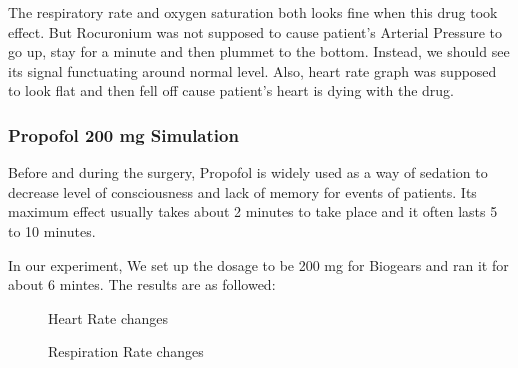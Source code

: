 \documentclass[a4paper]{article}
\begin{document}
The respiratory rate and oxygen saturation both looks fine when this drug took effect. But Rocuronium was not supposed to cause patient's Arterial Pressure to go up, stay for a minute and then plummet to the bottom. Instead, we should see its signal functuating around normal level. Also, heart rate graph was supposed to look flat and then fell off cause patient's heart is dying with the drug.
 
\subsubsection{Propofol 200 mg Simulation}

Before and during the surgery, Propofol is widely used as a way of sedation to decrease level of consciousness and lack of memory for events of patients. Its maximum effect usually takes about 2 minutes to take place and it often lasts 5 to 10 minutes.

In our experiment, We set up the dosage to be 200 mg for Biogears and ran it for about 6 mintes. The results are as followed:

\begin{figure}[!htb]\centering
   
\end{figure}

\begin{figure}[!htb]\centering
   \begin{minipage}{0.49\textwidth}
     \caption{Heart Rate changes}
     \label{fig:given 200 mg Propofol}
     \end{minipage}
   \begin {minipage}{0.49\textwidth}
     \caption{Respiration Rate changes}
     \label{fig:given 200 mg Propofol}
   \end{minipage}
\end{figure}
\end{document}
